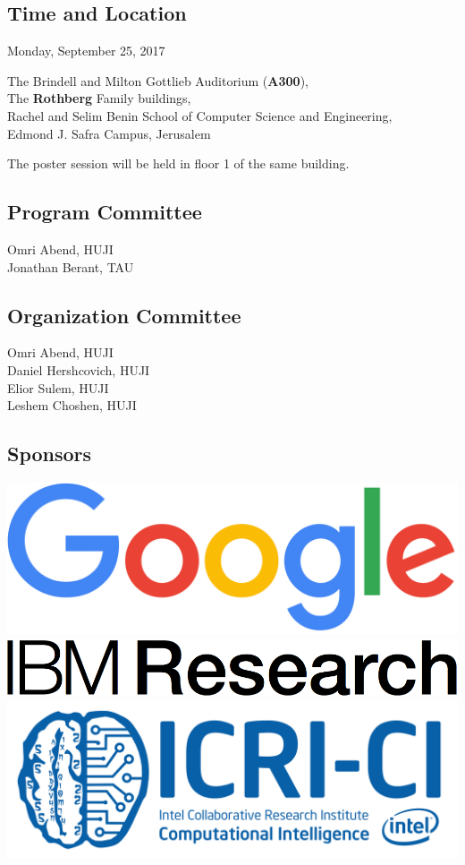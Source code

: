\documentclass[a0,portrait]{a0poster}
\begin{document}
\subsection*{Time and Location}\label{time-and-location}

Monday, September 25, 2017

The Brindell and Milton Gottlieb Auditorium (\textbf{A300}),\\
The \textbf{Rothberg} Family buildings,\\
Rachel and Selim Benin School of Computer Science and Engineering,\\
Edmond J. Safra Campus, Jerusalem

The poster session will be held in floor 1 of the same building.

\subsection*{Program Committee}\label{program-committee}

Omri Abend, HUJI\\
Jonathan Berant, TAU

\subsection*{Organization Committee}\label{organization-committee}

Omri Abend, HUJI\\
Daniel Hershcovich, HUJI\\
Elior Sulem, HUJI\\
Leshem Choshen, HUJI

\subsection*{Sponsors}\label{sponsors}

\includegraphics{img/google_logo.png}\\
\includegraphics{img/ibmresearch_logo.png}\\
\includegraphics{img/icrici_logo.png}
\end{document}

